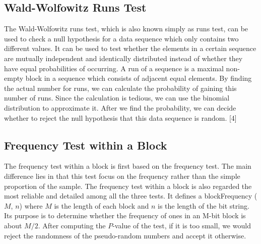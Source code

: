 \documentclass[a4paper,12pt]{article}
\begin{document}
\subsection{Wald-Wolfowitz Runs Test}
 \noindent The Wald-Wolfowitz runs test, which is also known simply as runs test, can be used to check a null hypothesis for a data sequence which only contains two different values. It can be used to test whether the elements in a certain sequence are mutually independent and identically distributed instead of whether they have equal probabilities of occurring. A run of a sequence is a maximal non-empty block in a sequence which consists of adjacent equal elements. By finding the actual number for runs, we can calculate the probability of gaining this number of runs. Since the calculation is tedious, we can use the binomial distribution to approximate it. After we find the probability, we can decide whether to reject the null hypothesis that this data sequence is random. [4]


\subsection{Frequency Test within a Block}
\noindent The frequency test within a block is first based on the frequency test. The main difference lies in that this test focus on the frequency rather than the simple proportion of the sample. The frequency test within a block is also regarded the most reliable and detailed among all the three tests. It defines a blockFrequency ($M$, $n$) where $M$ is the length of each block and $n$ is the length of the bit string. Its purpose is to determine whether the frequency of ones in an M-bit block is about $M/2$. After computing the $P$-value of the test, if it is too small, we would reject the randomness of the pseudo-random numbers and accept it otherwise.
\end{document}
